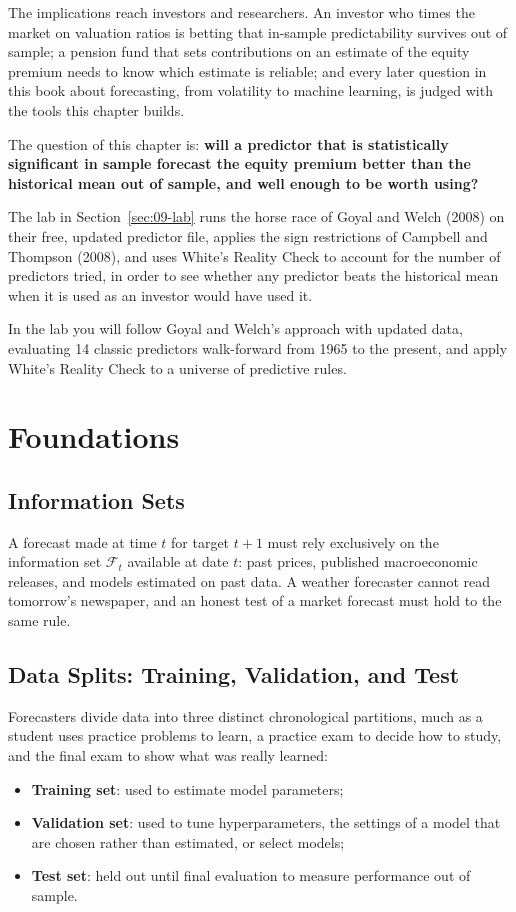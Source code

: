 The implications reach investors and researchers. An investor who times the market on valuation ratios is betting that in-sample predictability survives out of sample; a pension fund that sets contributions on an estimate of the equity premium needs to know which estimate is reliable; and every later question in this book about forecasting, from volatility to machine learning, is judged with the tools this chapter builds. 

The question of this chapter is: \textbf{will a predictor that is statistically significant in sample forecast the equity premium better than the historical mean out of sample, and well enough to be worth using?}

The lab in Section~\ref{sec:09-lab} runs the horse race of Goyal and Welch (2008) on their free, updated predictor file, applies the sign restrictions of Campbell and Thompson (2008), and uses White's Reality Check to account for the number of predictors tried, in order to see whether any predictor beats the historical mean when it is used as an investor would have used it.


In the lab you will follow Goyal and Welch's approach with updated data, evaluating 14 classic predictors walk-forward from 1965 to the present, and apply White's Reality Check to a universe of predictive rules.


\section{Foundations}
\label{sec:09-foundations}

\subsection{Information Sets}
A forecast made at time $t$ for target $t+1$ must rely exclusively on the information set $\mathcal{F}_t$ available at date $t$: past prices, published macroeconomic releases, and models estimated on past data. A weather forecaster cannot read tomorrow's newspaper, and an honest test of a market forecast must hold to the same rule.

\subsection{Data Splits: Training, Validation, and Test}
Forecasters divide data into three distinct chronological partitions, much as a student uses practice problems to learn, a practice exam to decide how to study, and the final exam to show what was really learned:
\begin{itemize}
  \item \textbf{Training set}: used to estimate model parameters;
  \item \textbf{Validation set}: used to tune hyperparameters, the settings of a model that are chosen rather than estimated, or select models;
  \item \textbf{Test set}: held out until final evaluation to measure performance out of sample.
\end{itemize}

